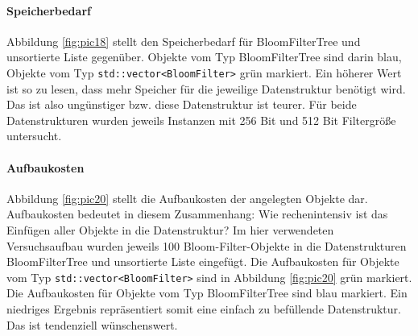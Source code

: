 \paragraph*{Speicherbedarf}
Abbildung \ref{fig:pic18} stellt den Speicherbedarf für BloomFilterTree und unsortierte Liste gegenüber. Objekte vom Typ BloomFilterTree sind darin blau, Objekte vom Typ \texttt{std::vector<BloomFilter>} grün markiert. Ein höherer Wert ist so zu lesen, dass mehr Speicher für die jeweilige Datenstruktur benötigt wird. Das ist also ungünstiger bzw. diese Datenstruktur ist teurer. Für beide Datenstrukturen wurden jeweils Instanzen mit 256 Bit und 512 Bit Filtergröße untersucht. 
\paragraph*{Aufbaukosten}
Abbildung \ref{fig:pic20} stellt die Aufbaukosten der angelegten Objekte dar. Aufbaukosten bedeutet in diesem Zusammenhang: Wie rechenintensiv ist das Einfügen aller Objekte in die Datenstruktur? Im hier verwendeten Versuchsaufbau wurden jeweils 100 Bloom-Filter-Objekte in die Datenstrukturen BloomFilterTree und unsortierte Liste eingefügt. Die Aufbaukosten für Objekte vom Typ \texttt{std::vector<BloomFilter>} sind in Abbildung \ref{fig:pic20} grün markiert. Die Aufbaukosten für Objekte vom Typ BloomFilterTree sind blau markiert. Ein niedriges Ergebnis repräsentiert somit eine einfach zu befüllende Datenstruktur. Das ist tendenziell wünschenswert. 
